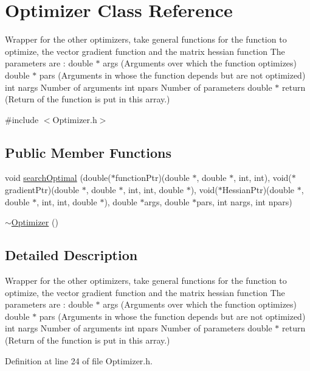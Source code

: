\hypertarget{classOptimizer}{}\section{Optimizer Class Reference}
\label{classOptimizer}


Wrapper for the other optimizers, take general functions for the function to optimize, the vector gradient function and the matrix hessian function The parameters are \+: double $\ast$ args (Arguments over which the function optimizes) double $\ast$ pars (Arguments in whose the function depends but are not optimized) int nargs Number of arguments int npars Number of parameters double $\ast$ return (Return of the function is put in this array.)  




{\ttfamily \#include $<$Optimizer.\+h$>$}

\subsection*{Public Member Functions}
\begin{DoxyCompactItemize}
\item 
void \hyperlink{classOptimizer_ab3c54cfddcd5e97c1dae4cc6bd4e4e92}{search\+Optimal} (double($\ast$function\+Ptr)(double $\ast$, double $\ast$, int, int), void($\ast$gradient\+Ptr)(double $\ast$, double $\ast$, int, int, double $\ast$), void($\ast$Hessian\+Ptr)(double $\ast$, double $\ast$, int, int, double $\ast$), double $\ast$args, double $\ast$pars, int nargs, int npars)
\item 
\hyperlink{classOptimizer_ab01202385afea2f09afbd73227736a17}{$\sim$\+Optimizer} ()
\end{DoxyCompactItemize}


\subsection{Detailed Description}
Wrapper for the other optimizers, take general functions for the function to optimize, the vector gradient function and the matrix hessian function The parameters are \+: double $\ast$ args (Arguments over which the function optimizes) double $\ast$ pars (Arguments in whose the function depends but are not optimized) int nargs Number of arguments int npars Number of parameters double $\ast$ return (Return of the function is put in this array.) 

Definition at line 24 of file Optimizer.\+h.



